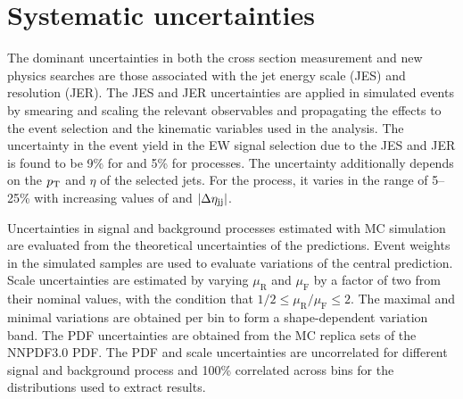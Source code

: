 \section{Systematic uncertainties}

The dominant uncertainties in both the cross section measurement 
and new physics searches are those associated with 
the jet energy scale (JES) and resolution (JER).  The JES and JER 
uncertainties are applied in simulated events by smearing and 
scaling the relevant
observables and propagating the effects to the event selection and 
the kinematic variables used in the analysis.
The uncertainty in the event yield in the EW signal selection
due to the JES and JER 
is found to be 9\% for \QCDWZ and 5\% for \EWWZ processes.
The uncertainty additionally depends on the $p_{\mathrm{T}}$ and $\eta$ of the selected
jets. For the \QCDWZ process, it varies in the range of 5--25\% with
increasing values of {\mjj} and $\left|\Delta\eta_{\mathrm{jj}}\right|$.

Uncertainties in signal and background processes estimated with
MC simulation are evaluated from the theoretical uncertainties 
of the predictions. 
Event weights in the simulated samples are used to evaluate 
variations of the central prediction.
Scale uncertainties are estimated by varying
$\mu_{\mathrm{R}}$ and $\mu_{\mathrm{F}}$ by a factor of two from their
nominal values, with the condition that $1/2 \le \mu_{\mathrm{R}}/\mu_{\mathrm{F}} \le 2$.
The maximal and minimal variations are obtained
per bin to form a shape-dependent variation band.
The PDF uncertainties are obtained from the MC replica sets 
of the NNPDF3.0 PDF. 
The PDF and scale uncertainties are uncorrelated for different signal and
background process and 100\% correlated across bins for the distributions
used to extract results.

